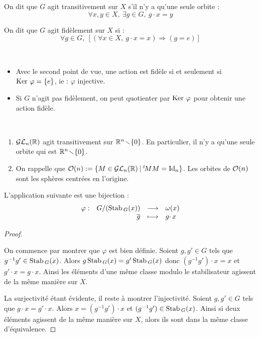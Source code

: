 \begin{defi}

 On dit que $G$ agit transitivement sur $X$ s'il n'y a qu'une seule orbite :
\[\forall x,y \in X,\ \exists g\in
G,\ g\cdotp x = y\]
\end{defi}

\begin{defi}

 On dit que $G$ agit fidèlement sur $X$ si :
\[\forall g\in G,\ \left[ (\forall x \in X,\ g\cdotp x = x) \Longrightarrow (g =
e) \right] \]
\end{defi}


\begin{example}[Remarques] \
 \begin{itemize}
  \item Avec le second point de vue, une action est fidèle si et seulement si
$\operatorname{Ker\,}\varphi = \{e\}$, ie : $\varphi$ injective.
 \item Si $G$ n'agit pas fidèlement, on peut quotienter par $\operatorname{Ker\,}\varphi$
pour obtenir une action fidèle.
 \end{itemize}
\end{example}

\begin{example}[Exemples]\ 
\begin{enumerate}
  \item $\mathcal{GL}_n(\mathbb{R})$ agit transitivement sur $\mathbb{R}^n\!\smallsetminus\!{}\{0\}$. En
particulier, il n'y a qu'une seule orbite qui est $\mathbb{R}^n\!\smallsetminus\!{}\{0\}$.
  \item On rappelle que $\mathcal{O}(n) := \{M\in \mathcal{GL}_n (\mathbb{R}) \: | \: {}^t\! MM = \operatorname{Id}_n\}$. Les
orbites de $\mathcal{O}(n)$ sont les sphères centrées en l'origine.
 \end{enumerate}
\end{example}

\begin{prop}

 L'application suivante est une bijection :
\[  \begin{array}{rrcl} \varphi :&
              G/(\operatorname{Stab\,}_G(x)) &\longrightarrow& \omega (x) \\
              & \overline{g}   &\longmapsto    &g\cdotp x
             \end{array} \]
\end{prop}

\begin{proof}\ 

 On commence par montrer que $\varphi$ est bien définie.
Soient $g,g' \in G$ tels que $g^{-1}g' \in \operatorname{Stab\,}_G (x)$. Alors $g\operatorname{Stab\,}_G(x) =
g'\operatorname{Stab\,}_G(x)$ donc $(g^{-1}g')\cdotp x = x $ et $ g' \cdotp x = g
\cdotp x$. Ainsi les éléments d'une même classe modulo le stabilisateur
agissent de la même manière sur $X$.

La surjectivité étant évidente, il reste à montrer l'injectivité. Soient $g,g'
\in G$ tels que $g\cdotp x = g' \cdotp x$. Alors $x = (g^{-1}g')\cdotp x$ et
$(g^{-1}g') \in \operatorname{Stab\,}_G(x)$. Ainsi si deux éléments agissent de la même manière
sur $X$, alors ils sont dans la même classe d'équivalence.
\end{proof}

